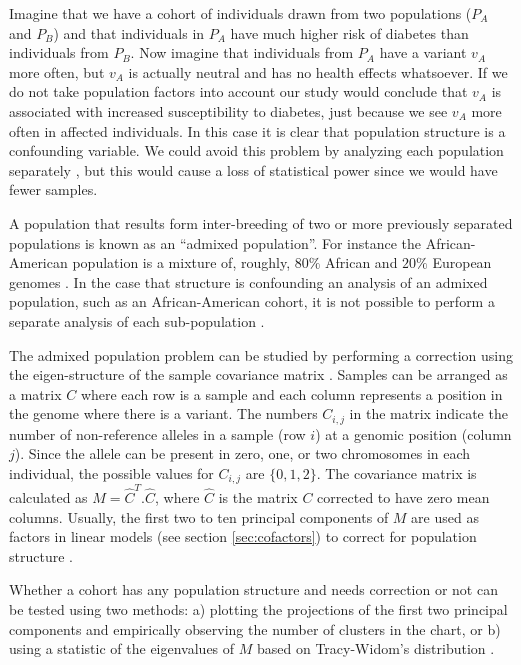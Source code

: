 Imagine that we have a cohort of individuals drawn from two populations ($P_A$ and $P_B$) and that individuals in $P_A$ have much higher risk of diabetes than individuals from $P_B$. 
Now imagine that individuals from $P_A$ have a variant $v_A$ more often, but $v_A$ is actually neutral and has no health effects whatsoever. 
If we do not take population factors into account our study would conclude that $v_A$ is associated with increased susceptibility to diabetes, just because we see $v_A$ more often in affected individuals. 
In this case it is clear that population structure is a confounding variable. 
We could avoid this problem by analyzing each population separately \cite{patterson2006population}, but this would cause a loss of statistical power since we would have fewer samples.

A population that results form inter-breeding of two or more previously separated populations is known as an ``admixed population''. 
For instance the African-American population is a mixture of, roughly, $80\%$ African and $20\%$ European genomes \cite{hartl1997principles,balding2006tutorial}. 
In the case that structure is confounding an analysis of an admixed population, such as an African-American cohort, it is not possible to perform a separate analysis of each sub-population \cite{hartl1997principles}.

The admixed population problem can be studied by performing a correction using the eigen-structure of the sample covariance matrix \cite{patterson2006population}. 
Samples can be arranged as a matrix $C$ where each row is a sample and each column represents a position in the genome where there is a variant. The numbers $C_{i,j}$ in the matrix indicate the number of non-reference alleles in a sample (row $i$) at a genomic position (column $j$). 
Since the allele can be present in zero, one, or two chromosomes in each individual, the possible values for $C_{i,j}$ are $\{0, 1, 2\}$. 
The covariance matrix is calculated as $M= \hat{C}^T . \hat{C}$, where $\hat{C}$ is the matrix $C$ corrected to have zero mean columns. 
Usually, the first two to ten principal components of $M$ are used as factors in linear models (see section \ref{sec:cofactors}) to correct for population structure \cite{patterson2006population}.

Whether a cohort has any population structure and needs correction or not can be tested using two methods: 
a) plotting the projections of the first two principal components and empirically observing the number of clusters in the chart, or 
b) using a statistic of the eigenvalues of $M$ based on Tracy-Widom's distribution \cite{patterson2006population}.

